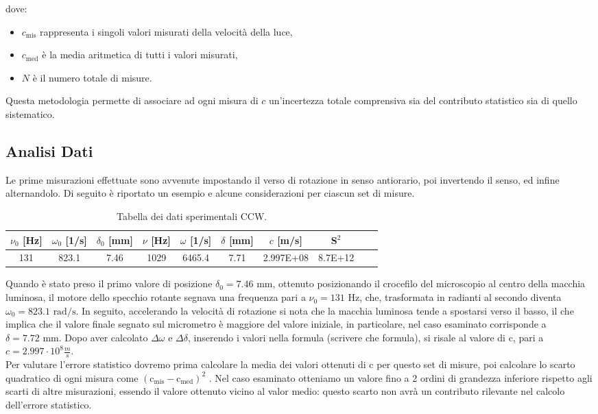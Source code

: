 \documentclass{article}
\begin{document}
dove:
\begin{itemize}
    \item $c_{\text{mis}}$ rappresenta i singoli valori misurati della velocità della luce,
    \item $c_{\text{med}}$ è la media aritmetica di tutti i valori misurati,
    \item $N$ è il numero totale di misure.
\end{itemize}

Questa metodologia permette di associare ad ogni misura di \(c\) un'incertezza totale comprensiva sia del contributo statistico sia di quello sistematico.

\subsection{Analisi Dati}

Le prime misurazioni effettuate sono avvenute impostando il verso di rotazione in senso antiorario, poi invertendo il senso, ed infine alternandolo. Di seguito è riportato un esempio e alcune considerazioni per ciascun set di misure.

\begin{table}[h!]
    \centering
    
    \begin{tabular}{|c|c|c|c|c|c|c|c|c|c|} 
        \hline
        $\nu_0$ [Hz] & $\omega_0$ [1/s] & $\delta_0$ [mm] & $\nu$ [Hz] & $\omega$ [1/s] & $\delta$ [mm] &  $c$ [m/s] & S$^2$\\ 
        \hline
        131 & 823.1 & 7.46 & 1029 & 6465.4 & 7.71 & 2.997E+08& 8.7E+12\\ 
        \hline
    \end{tabular}
    \caption{Tabella dei dati sperimentali CCW.}
    \label{tab:dati}
\end{table}
Quando è stato preso il primo valore di posizione \(\delta_0 = 7.46 \text{ mm}\), ottenuto posizionando il crocefilo del microscopio al centro della macchia luminosa, il motore dello specchio rotante segnava una frequenza pari a \(\nu_0 = 131 \text{ Hz}\), che, trasformata in radianti al secondo diventa \(\omega_0 = 823.1 \text{ rad/s}\). 
In seguito, accelerando la velocità di rotazione si nota che la macchia luminosa tende a spostarsi verso il basso, il che implica che il valore finale segnato sul micrometro è maggiore del valore iniziale, in particolare, nel caso esaminato corrisponde a \(\delta=7.72\text{ mm}\). 
Dopo aver calcolato \(\Delta\omega\) e \(\Delta\delta\), inserendo i valori nella formula (scrivere che formula), si risale al valore di c, pari a \(c=2.997\cdot10^8\frac{m}{s}\). \\
Per valutare l'errore statistico dovremo prima calcolare la media dei valori ottenuti di \(\text{c}\) per questo set di misure, poi calcolare lo scarto quadratico di ogni misura come \((\text{c}_\text{mis} -\text{c}_\text{med})^2\) . 
Nel caso esaminato otteniamo un valore fino a 2 ordini di grandezza inferiore rispetto agli scarti di altre misurazioni, essendo il valore ottenuto vicino al valor medio: questo scarto non avrà un contributo rilevante nel calcolo dell'errore statistico.
\end{document}

